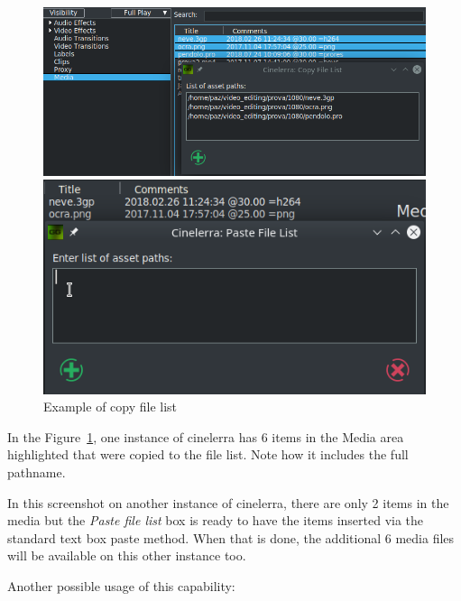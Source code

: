 \begin{figure}[htpb]
    \centering
    \begin{minipage}{.49\linewidth}
    \centering
        \includegraphics[width=0.99\linewidth]{images/copy_files1.png}
    \end{minipage}
    \hfill
    \begin{minipage}{.49\linewidth}
    \centering
        \includegraphics[width=0.99\linewidth]{images/copy_files2.png}
    \end{minipage}
    \caption{Example of copy file list}
    \label{fig:copy_files1}
\end{figure}

In the Figure~\ref{fig:copy_files1}, one instance of cinelerra has 6 items in the Media area highlighted that were copied to the file list.  
Note how it includes the full pathname.

In this screenshot on another instance of cinelerra, there are only 2 items in the media but the \textit{Paste file list} box is ready to have the items inserted via the standard text box paste method.  When that is done, the additional 6 media files will be available on this other instance too.


Another possible usage of this capability:

